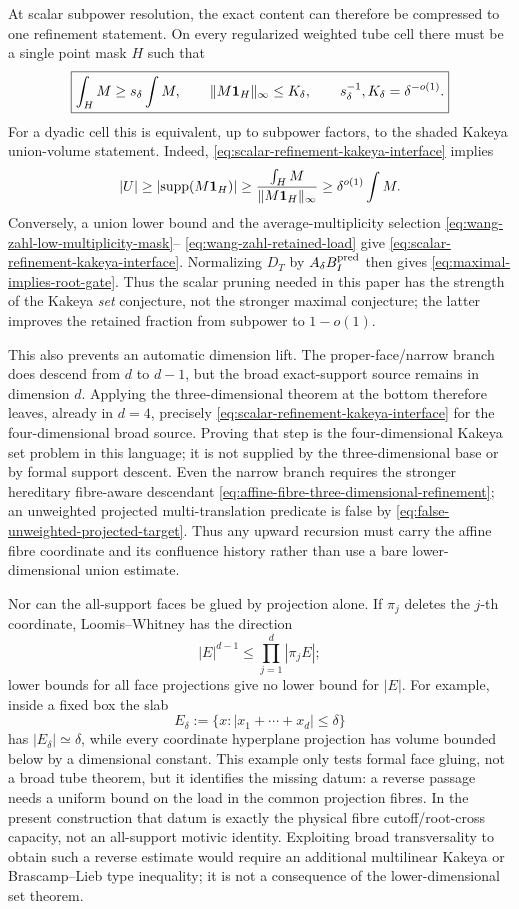 \documentclass[11pt]{article}
\newcommand{\supp}{\mathrm{supp}}
\begin{document}
At scalar subpower resolution, the exact content can therefore be compressed
to one refinement statement.  On every regularized weighted tube cell there
must be a single point mask \(H\) such that
\begin{equation}\label{eq:scalar-refinement-kakeya-interface}
 \boxed{
  \int_HM\ge s_\delta\int M,
  \qquad
  \|M{\bf1}_H\|_\infty\le K_\delta,
  \qquad
  s_\delta^{-1},K_\delta=\delta^{-o(1)}.}
\end{equation}
For a dyadic cell this is equivalent, up to subpower factors, to the shaded
Kakeya union-volume statement.  Indeed,
\eqref{eq:scalar-refinement-kakeya-interface} implies
\[
 |U|\ge|\supp(M{\bf1}_H)|
 \ge\frac{\int_HM}{\|M{\bf1}_H\|_\infty}
 \ge\delta^{o(1)}\int M.
\]
Conversely, a union lower bound and the average-multiplicity selection
\eqref{eq:wang-zahl-low-multiplicity-mask}--%
\eqref{eq:wang-zahl-retained-load} give
\eqref{eq:scalar-refinement-kakeya-interface}.  Normalizing \(D_T\) by
\(A_\delta B_I^{\rm pred}\) then gives
\eqref{eq:maximal-implies-root-gate}.  Thus the scalar pruning needed in this
paper has the strength of the Kakeya \emph{set} conjecture, not the stronger
maximal conjecture; the latter improves the retained fraction from subpower to
\(1-o(1)\).

This also prevents an automatic dimension lift.  The proper-face/narrow branch
does descend from \(d\) to \(d-1\), but the broad exact-support source remains
in dimension \(d\).  Applying the three-dimensional theorem at the bottom
therefore leaves, already in \(d=4\), precisely
\eqref{eq:scalar-refinement-kakeya-interface} for the four-dimensional broad
source.  Proving that step is the four-dimensional Kakeya set problem in this
language; it is not supplied by the three-dimensional base or by formal
support descent.  Even the narrow branch requires the stronger hereditary
fibre-aware descendant
\eqref{eq:affine-fibre-three-dimensional-refinement}; an unweighted projected
multi-translation predicate is false by
\eqref{eq:false-unweighted-projected-target}.  Thus any upward recursion must
carry the affine fibre coordinate and its confluence history rather than use a
bare lower-dimensional union estimate.

Nor can the all-support faces be glued by projection alone.  If \(\pi_j\)
deletes the \(j\)-th coordinate, Loomis--Whitney has the direction
\[
 |E|^{d-1}\le\prod_{j=1}^d|\pi_jE|;
\]
lower bounds for all face projections give no lower bound for \(|E|\).  For
example, inside a fixed box the slab
\[
 E_\delta:=\{x:|x_1+\cdots+x_d|\le\delta\}
\]
has \(|E_\delta|\simeq\delta\), while every coordinate hyperplane projection
has volume bounded below by a dimensional constant.  This example only tests
formal face gluing, not a broad tube theorem, but it identifies the missing
datum: a reverse passage needs a uniform bound on the load in the common
projection fibres.  In the present construction that datum is exactly the
physical fibre cutoff/root-cross capacity, not an all-support motivic
identity.  Exploiting broad transversality to obtain such a reverse estimate
would require an additional multilinear Kakeya or Brascamp--Lieb type
inequality; it is not a consequence of the lower-dimensional set theorem.
\end{document}
